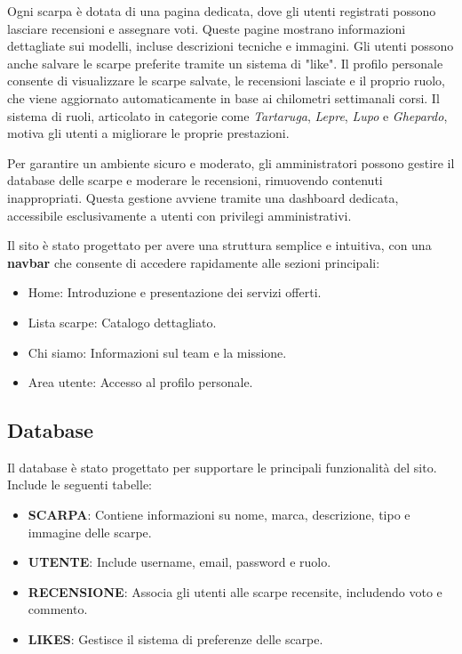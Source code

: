 \documentclass[a4paper, 12pt]{article}
\begin{document}
\begin{justify}
Ogni scarpa è dotata di una pagina dedicata, dove gli utenti registrati possono lasciare recensioni e assegnare voti. Queste pagine mostrano informazioni dettagliate sui modelli, incluse descrizioni tecniche e immagini. Gli utenti possono anche salvare le scarpe preferite tramite un sistema di "like". Il profilo personale consente di visualizzare le scarpe salvate, le recensioni lasciate e il proprio ruolo, che viene aggiornato automaticamente in base ai chilometri settimanali corsi. Il sistema di ruoli, articolato in categorie come \textit{Tartaruga}, \textit{Lepre}, \textit{Lupo} e \textit{Ghepardo}, motiva gli utenti a migliorare le proprie prestazioni.

Per garantire un ambiente sicuro e moderato, gli amministratori possono gestire il database delle scarpe e moderare le recensioni, rimuovendo contenuti inappropriati. Questa gestione avviene tramite una dashboard dedicata, accessibile esclusivamente a utenti con privilegi amministrativi.

Il sito \`e stato progettato per avere una struttura semplice e intuitiva, con una \textbf{navbar} che consente di accedere rapidamente alle sezioni principali:
\begin{itemize}
    \item Home: Introduzione e presentazione dei servizi offerti.
    \item Lista scarpe: Catalogo dettagliato.
    \item Chi siamo: Informazioni sul team e la missione.
    \item Area utente: Accesso al profilo personale.
\end{itemize}

\subsection{Database}
Il database \`e stato progettato per supportare le principali funzionalit\`a del sito. Include le seguenti tabelle:
\begin{itemize}
    \item \textbf{SCARPA}: Contiene informazioni su nome, marca, descrizione, tipo e immagine delle scarpe.
    \item \textbf{UTENTE}: Include username, email, password e ruolo.
    \item \textbf{RECENSIONE}: Associa gli utenti alle scarpe recensite, includendo voto e commento.
    \item \textbf{LIKES}: Gestisce il sistema di preferenze delle scarpe.
\end{itemize}


\end{justify}
\end{document}
